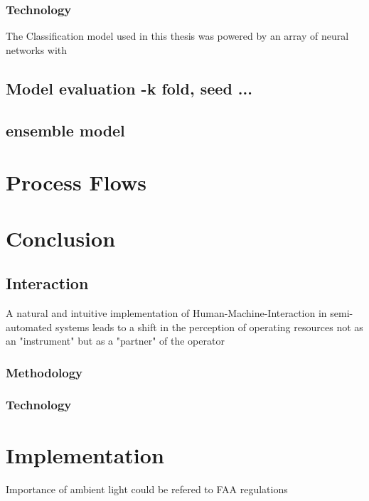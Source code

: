 \documentclass{article}
\begin{document}
\subsubsection{Technology}

The Classification model used in this thesis was powered by an array of neural networks with 

\subsection{Model evaluation -k fold, seed ...}
\subsection {ensemble model}

\quad \quad

\section{Process Flows}


\section {Conclusion}
\subsection{Interaction}


A natural and intuitive implementation of Human-Machine-Interaction in semi-automated systems leads to a shift in the perception of operating resources not as an "instrument" but as a "partner" of the operator

\subsubsection{Methodology}
\subsubsection{Technology}



\newpage

\section{Implementation}
Importance of ambient light could be refered to FAA regulations
\end{document}
